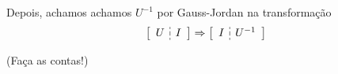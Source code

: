 \documentclass[a4paper,12pt,fleqn]{article}
\begin{document}
\begin{enumerate}
{\begin{enumerate}
	Depois, achamos achamos $U^{-1}$ por Gauss-Jordan na transformação
	\begin{equation*}
   		  \setlength{\dashlinegap}{2pt}
  		  \left[
  		  		\begin{array}{c:c}
				   U & I 
		        \end{array}
		  \right]
		  \Rightarrow
   		  \setlength{\dashlinegap}{2pt}
  		  \left[
  		  		\begin{array}{c:c}
				   I & U ^{-1} 
		        \end{array}
		  \right]
	\end{equation*}   
  
    (Faça as contas!)
  
    
    
    \end{enumerate}
    
}
 


\end{enumerate}
\end{document}
